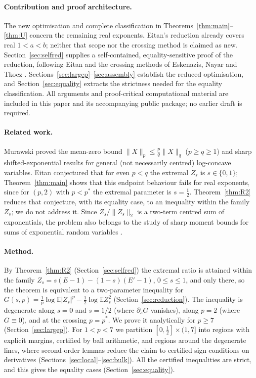 \documentclass[11pt]{article}
\theoremstyle{remark}
\newcommand{\E}{\mathbb E}
\begin{document}
\paragraph{Contribution and proof architecture.} The new optimisation and complete classification in Theorems~\ref{thm:main}--\ref{thm:U} concern the remaining real exponents. Eitan's reduction already covers real $1<a<b$; neither that scope nor the crossing method is claimed as new. Section~\ref{sec:selfred} supplies a self-contained, equality-sensitive proof of the reduction, following Eitan \cite[Sections~2--3]{Eitan} and the crossing methods of Eskenazis, Nayar and Tkocz \cite{ENT}. Sections~\ref{sec:largep}--\ref{sec:assembly} establish the reduced optimisation, and Section~\ref{sec:equality} extracts the strictness needed for the equality classification. All arguments and proof-critical computational material are included in this paper and its accompanying public package; no earlier draft is required.

\paragraph{Related work.} Murawski \cite{Murawski} proved the mean-zero bound $\|X\|_p\le\frac pq\|X\|_q$ ($p\ge q\ge1$) and sharp shifted-exponential results for general (not necessarily centred) log-concave variables. Eitan conjectured \cite[Conjecture~16 in arXiv v1]{Eitan} that for even $p<q$ the extremal $Z_s$ is $s\in\{0,1\}$; Theorem~\ref{thm:main} shows that this endpoint behaviour fails for real exponents, since for $(p,2)$ with $p<p^*$ the extremal parameter is $s=\frac12$. Theorem~\ref{thm:R2} reduces that conjecture, with its equality case, to an inequality within the family $Z_s$; we do not address it. Since $Z_s/\|Z_s\|_2$ is a two-term centred sum of exponentials, the problem also belongs to the study of sharp moment bounds for sums of exponential random variables \cite{BTT,BP}.

\paragraph{Method.} By Theorem~\ref{thm:R2} (Section~\ref{sec:selfred}) the extremal ratio is attained within the family $Z_s=s(E-1)-(1-s)(E'-1)$, $0\le s\le1$, and only there, so the theorem is equivalent to a two-parameter inequality for $G(s,p)=\frac1p\log\E|Z_s|^p-\frac12\log\E Z_s^2$ (Section~\ref{sec:reduction}). The inequality is degenerate along $s=0$ and $s=1/2$ (where $\partial_sG$ vanishes), along $p=2$ (where $G\equiv0$), and at the crossing $p=p^*$. We prove it analytically for $p\ge7$ (Section~\ref{sec:largep}). For $1<p<7$ we partition $[0,\frac12]\times(1,7]$ into regions with explicit margins, certified by ball arithmetic, and regions around the degenerate lines, where second-order lemmas reduce the claim to certified sign conditions on derivatives (Sections~\ref{sec:local}--\ref{sec:bulk}). All the certified inequalities are strict, and this gives the equality cases (Section~\ref{sec:equality}).
\end{document}
